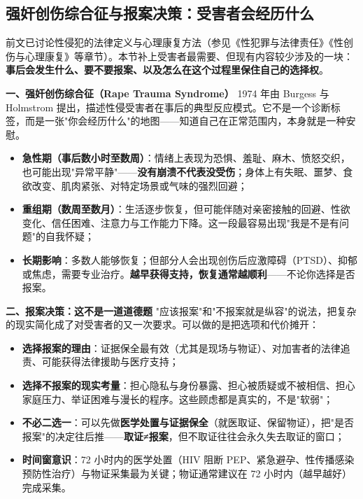 \subsection{强奸创伤综合征与报案决策：受害者会经历什么}

前文已讨论性侵犯的法律定义与心理康复方法（参见《性犯罪与法律责任》《性创伤与心理康复》等章节）。本节补上受害者最需要、但现有内容较少涉及的一块：\textbf{事后会发生什么、要不要报案、以及怎么在这个过程里保住自己的选择权}。

\textbf{一、强奸创伤综合征（Rape Trauma Syndrome）}
1974 年由 Burgess 与 Holmstrom 提出，描述性侵受害者在事后的典型反应模式。它不是一个诊断标签，而是一张"你会经历什么"的地图——知道自己在正常范围内，本身就是一种安慰。
\begin{itemize}
\item \textbf{急性期（事后数小时至数周）}：情绪上表现为恐惧、羞耻、麻木、愤怒交织，也可能出现"异常平静"——\textbf{没有崩溃不代表没受伤}；身体上有失眠、噩梦、食欲改变、肌肉紧张、对特定场景或气味的强烈回避；
\item \textbf{重组期（数周至数月）}：生活逐步恢复，但可能伴随对亲密接触的回避、性欲变化、信任困难、注意力与工作能力下降。这一段最容易出现"我是不是有问题"的自我怀疑；
\item \textbf{长期影响}：多数人能够恢复；但部分人会出现创伤后应激障碍（PTSD）、抑郁或焦虑，需要专业治疗。\textbf{越早获得支持，恢复通常越顺利}——不论你选择是否报案。
\end{itemize}

\textbf{二、报案决策：这不是一道道德题}
"应该报案"和"不报案就是纵容"的说法，把复杂的现实简化成了对受害者的又一次要求。可以做的是把选项和代价摊开：
\begin{itemize}
\item \textbf{选择报案的理由}：证据保全最有效（尤其是现场与物证）、对加害者的法律追责、可能获得法律援助与医疗支持；
\item \textbf{选择不报案的现实考量}：担心隐私与身份暴露、担心被质疑或不被相信、担心家庭压力、举证困难与漫长的程序。这些顾虑都是真实的，不是"软弱"；
\item \textbf{不必二选一}：可以先做\textbf{医学处置与证据保全}（就医取证、保留物证），把"是否报案"的决定往后推——\textbf{取证≠报案}，但不取证往往会永久失去取证的窗口；
\item \textbf{时间窗意识}：72 小时内的医学处置（HIV 阻断 PEP、紧急避孕、性传播感染预防性治疗）与物证采集最为关键；物证通常建议在 72 小时内（越早越好）完成采集。
\end{itemize}

